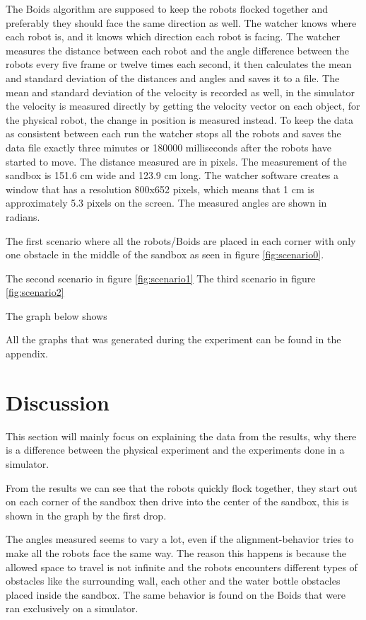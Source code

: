 The Boids algorithm are supposed to keep the robots flocked together and preferably they should face the same direction as well. The watcher knows where each robot is, and it knows which direction each robot is facing. The watcher measures the distance between each robot and the angle difference between the robots every five frame or twelve times each second, it then calculates the mean and standard deviation of the distances and angles and saves it to a file. The mean and standard deviation of the velocity is recorded as well, in the simulator the velocity is measured directly by getting the velocity vector on each object, for the physical robot, the change in position is measured instead.
To keep the data as consistent between each run the watcher stops all the robots and saves the data file exactly three minutes or 180000 milliseconds after the robots have started to move.
The distance measured are in pixels. The measurement of the sandbox is 151.6 cm wide and 123.9 cm long. The watcher software creates a window that has a resolution 800x652 pixels, which means that 1 cm is approximately 5.3 pixels on the screen. The measured angles are shown in radians.

The first scenario where all the robots/Boids are placed in each corner with only one obstacle in the middle of the sandbox as seen in figure \ref{fig:scenario0}. 

The second scenario in figure \ref{fig:scenario1}
The third scenario in figure \ref{fig:scenario2}

The graph below shows

All the graphs that was generated during the experiment can be found in the appendix.
\section{Discussion}
\label{sec:discussion}
This section will mainly focus on explaining the data from the results, why there is a difference between the physical experiment and the experiments done in a simulator. 

From the results we can see that the robots quickly flock together, they start out on each corner of the sandbox then drive into the center of the sandbox, this is shown in the graph by the first drop. 

The angles measured seems to vary a lot, even if the alignment-behavior tries to make all the robots face the same way. The reason this happens is because the allowed space to travel is not infinite and the robots encounters different types of obstacles like the surrounding wall, each other and the water bottle obstacles placed inside the sandbox. The same behavior is found on the Boids that were ran exclusively on a simulator. 

